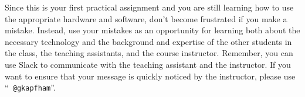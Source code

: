 Since this is your first practical assignment and you are still learning how to use the appropriate hardware and
software, don't become frustrated if you make a mistake. Instead, use your mistakes as an opportunity for learning both
about the necessary technology and the background and expertise of the other students in the class, the teaching
assistants, and the course instructor. Remember, you can use Slack to communicate with the teaching assistant and the
instructor. If you want to ensure that your message is quickly noticed by the instructor, please use ``{\tt
@gkapfham}''.



